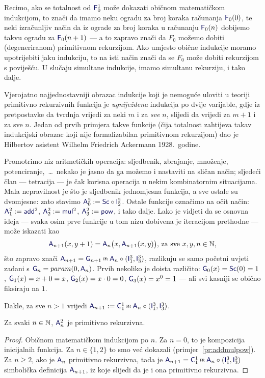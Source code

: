 Recimo, ako se totalnost od $\f F_0^1$ može dokazati običnom matematičkom indukcijom, to znači da imamo neku ogradu za broj koraka računanja $\f F_0(0)$, te neki izračunljiv način da iz ograde za broj koraka u računanju $\f F_0(n)$ dobijemo takvu ogradu za $\f F_0(n+1)$ --- a to zapravo znači da $F_0$ možemo dobiti (degeneriranom) primitivnom rekurzijom. Ako umjesto obične indukcije moramo upotrijebiti jaku indukciju, to na isti način znači da se $F_0$ može dobiti rekurzijom s poviješću. U slučaju simultane indukcije, imamo simultanu rekurziju, i tako dalje.

Vjerojatno najjednostavniji obrazac indukcije koji je nemoguće uloviti u teoriji primitivno rekurzivnih funkcija je \emph{ugniježđena} indukcija po dvije varijable, gdje iz pretpostavke da tvrdnja vrijedi za neki $m$ i za \emph{sve} $n$, slijedi da vrijedi za $m+1$ i za sve $n$. Jedan od prvih primjera takve funkcije (čija totalnost zahtijeva takav indukcijski obrazac koji nije formalizabilan primitivnom rekurzijom) dao je Hilbertov asistent Wilhelm Friedrich Ackermann 1928.\ godine.

Promotrimo niz aritmetičkih operacija: sljedbenik, zbrajanje, množenje, potenciranje,~\ldots\ nekako je jasno da ga možemo i nastaviti na sličan način; sljedeći član --- tetracija --- je čak korisna operacija u nekim kombinatornim situacijama. Mala nepravilnost je što je sljedbenik jednomjesna funkcija, a sve ostale su dvomjesne: zato stavimo $\f A_0^2:=\f{Sc}\circ \f I_2^2$. Ostale funkcije označimo na očit način: $\f A_1^2:=\f{add}^2$, $\f A_2^2:=\f{mul}^2$, $\f A_3^2:=\f{pow}$, i tako dalje. Lako je vidjeti da se osnovna ideja --- svaka osim prve funkcije u tom nizu dobivena je iteracijom prethodne --- može iskazati kao
\begin{equation}\label{eq:A2SSdef}
    \f A_{n+1}(x,y+1)=\f A_n\bigl(x,\f A_{n+1}(x,y)\bigr)\text{, za sve }x,y,n\in\N\text,
\end{equation}
što zapravo znači $\f A_{n+1}=\f G_{n+1}\pr\f A_n\circ(\f I_1^3,\f I_3^3)$, razlikuju se samo početni uvjeti zadani s $\f G_n=param(0,\f A_n)$. Prvih nekoliko je doista različito: $\f G_0(x)=\f{Sc}(0)=1$, $\f G_1(x)=x+0=x$, $\f G_2(x)=x\cdot 0=0$, $\f G_3(x)=x^0=1$ --- ali svi kasniji se obično fiksiraju na $1$.

Dakle, za sve $n>1$ vrijedi $\f A_{n+1}:=\f C_1^1\pr\f A_n\circ(\f I_1^3,\f I_3^3)$.

\begin{propozicija}\label{pp:Anprn}
    Za svaki $n\in{\mathbb N}$, $\f A_n^2$ je primitivno rekurzivna.
\end{propozicija}
\begin{proof}
Običnom matematičkom indukcijom po $n$. Za $n=0$, to je kompozicija inicijalnih funkcija. Za $n\in\{1,2\}$ to smo već dokazali (primjer~\ref{pr:addmulpow}). Za $n\ge 2$, ako je $\f A_n$ primitivno rekurzivna, tada je $\f A_{n+1}=\f C_1^1\pr\f A_n\circ(\f I_1^3,\f I_3^3)$ simbolička definicija $\f A_{n+1}$, iz koje slijedi da je i ona primitivno rekurzivna.
\end{proof}


